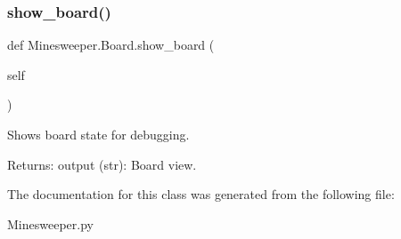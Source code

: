 \subsubsection{\texorpdfstring{show\+\_\+board()}{show\_board()}}
{\footnotesize\ttfamily def Minesweeper.\+Board.\+show\+\_\+board (\begin{DoxyParamCaption}\item[{}]{self }\end{DoxyParamCaption})}

\begin{DoxyVerb}Shows board state for debugging.

Returns:
    output (str): Board view.
\end{DoxyVerb}
 

The documentation for this class was generated from the following file\+:\begin{DoxyCompactItemize}
\item 
Minesweeper.\+py\end{DoxyCompactItemize}
